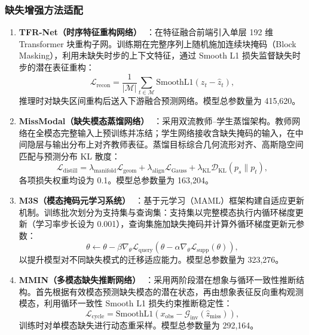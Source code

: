 \documentclass[UTF8,a4paper,11pt]{ctexart}
\begin{document}
\subsubsection{缺失增强方法适配}
\begin{enumerate}[label=(\arabic*),leftmargin=2.5em,itemsep=4pt,topsep=3pt]
  \item \textbf{TFR-Net（时序特征重构网络）~\cite{q2tfr}}：在特征融合前端引入单层 192 维 Transformer 块重构子网。训练期在完整序列上随机施加连续块掩码（Block Masking），利用未缺失时步的上下文特征，通过 Smooth L1 损失监督缺失时步的潜在表征重构：
  \begin{equation}
    \mathcal{L}_{\text{recon}} = \frac{1}{|\mathcal{M}|} \sum_{t \in \mathcal{M}} \text{SmoothL1}(z_t - \hat{z}_t),
  \end{equation}
  推理时对缺失区间重构后送入下游融合预测网络。模型总参数量为 415,620。

  \item \textbf{MissModal（缺失模态蒸馏网络）~\cite{q2missmodal}}：采用双流教师--学生蒸馏架构。教师网络在全模态完整输入上预训练并冻结；学生网络接收含缺失掩码的输入，在中间隐层与输出分布上对齐教师表征。蒸馏目标综合几何流形对齐、高斯隐空间匹配与预测分布 KL 散度：
  \begin{equation}
    \mathcal{L}_{\text{distill}} = \lambda_{\text{manifold}} \mathcal{L}_{\text{geom}} + \lambda_{\text{align}} \mathcal{L}_{\text{Gauss}} + \lambda_{\text{KL}} \mathcal{D}_{\text{KL}}(p_s \parallel p_t),
  \end{equation}
  各项损失权重均设为 0.1。模型总参数量为 163,204。

  \item \textbf{M3S（模态掩码元学习系统）~\cite{q2m3s}}：基于元学习（MAML）框架构建自适应更新机制。训练批次划分为支持集与查询集：支持集以完整模态执行内循环梯度更新（学习率步长设为 0.001），查询集施加缺失掩码并计算外循环梯度更新元参数：
  \begin{equation}
    \theta \leftarrow \theta - \beta \nabla_{\theta} \mathcal{L}_{\text{query}} \left( \theta - \alpha \nabla_{\theta} \mathcal{L}_{\text{supp}}(\theta) \right),
  \end{equation}
  以提升模型对不同缺失模式的迁移适应能力。模型总参数量为 323,276。

  \item \textbf{MMIN（多模态缺失推断网络）~\cite{q2mmin}}：采用两阶段潜在想象与循环一致性推断结构。首先根据有效模态预测缺失模态的潜在状态，再由想象表征反向重构观测模态，利用循环一致性 Smooth L1 损失约束推断稳定性：
  \begin{equation}
    \mathcal{L}_{\text{cycle}} = \text{SmoothL1}(x_{\text{obs}} - \mathcal{G}_{\text{inv}}(\hat{z}_{\text{miss}})),
  \end{equation}
  训练时对单模态缺失进行动态重采样。模型总参数量为 292,164。
\end{enumerate}
\end{document}
